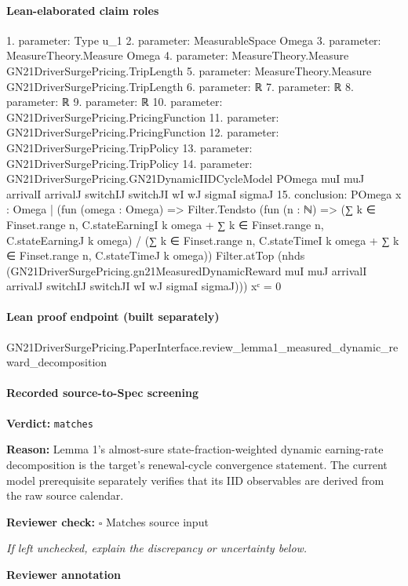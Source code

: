 \documentclass[10pt]{article}
\newcommand{\reviewerbox}{%
  \par\noindent\fbox{\parbox{0.96\linewidth}{\rule{0pt}{0.38in}}}\par
}
\newcommand{\reviewmatch}[1]{%
  \par\noindent\textbf{Reviewer check:} $\square$\; #1\par
  \noindent\emph{If left unchecked, explain the discrepancy or uncertainty below.}\par
}
\begin{document}
\paragraph{Lean-elaborated claim roles}\begin{ReviewVerbatim}
1. parameter: Type u_1
2. parameter: MeasurableSpace Omega
3. parameter: MeasureTheory.Measure Omega
4. parameter: MeasureTheory.Measure GN21DriverSurgePricing.TripLength
5. parameter: MeasureTheory.Measure GN21DriverSurgePricing.TripLength
6. parameter: ℝ
7. parameter: ℝ
8. parameter: ℝ
9. parameter: ℝ
10. parameter: GN21DriverSurgePricing.PricingFunction
11. parameter: GN21DriverSurgePricing.PricingFunction
12. parameter: GN21DriverSurgePricing.TripPolicy
13. parameter: GN21DriverSurgePricing.TripPolicy
14. parameter: GN21DriverSurgePricing.GN21DynamicIIDCycleModel POmega muI muJ arrivalI arrivalJ switchIJ switchJI wI wJ sigmaI sigmaJ
15. conclusion: POmega
    {x : Omega |
        (fun (omega : Omega) =>
            Filter.Tendsto
              (fun (n : ℕ) =>
                (∑ k ∈ Finset.range n, C.stateEarningI k omega + ∑ k ∈ Finset.range n, C.stateEarningJ k omega) /
                  (∑ k ∈ Finset.range n, C.stateTimeI k omega + ∑ k ∈ Finset.range n, C.stateTimeJ k omega))
              Filter.atTop
              (nhds
                (GN21DriverSurgePricing.gn21MeasuredDynamicReward muI muJ arrivalI arrivalJ switchIJ switchJI wI wJ
                  sigmaI sigmaJ)))
          x}ᶜ =
  0
\end{ReviewVerbatim}

\paragraph{Lean proof endpoint (built separately)}\begin{ReviewVerbatim}
GN21DriverSurgePricing.PaperInterface.review_lemma1_measured_dynamic_reward_decomposition
\end{ReviewVerbatim}

\paragraph{Recorded source-to-Spec screening}
\textbf{Verdict:} \texttt{matches}
\\
{\raggedright
\textbf{Reason:} Lemma 1's almost-\allowbreak{}sure state-\allowbreak{}fraction-\allowbreak{}weighted dynamic earning-\allowbreak{}rate decomposition is the target's renewal-\allowbreak{}cycle convergence statement.\allowbreak{} The current model prerequisite separately verifies that its IID observables are derived from the raw source calendar.\allowbreak{}
\par}
\reviewmatch{Matches source input}
\noindent\textbf{Reviewer annotation}\par
\reviewerbox
\clearpage
\hypertarget{source-claim-dbe4c990fc185239}{}
\end{document}
